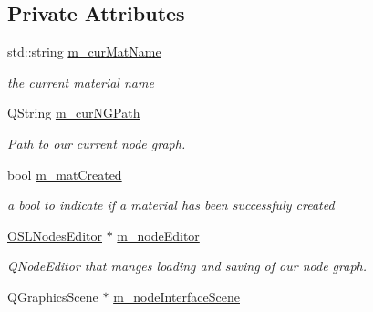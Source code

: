\subsection*{Private Attributes}
\begin{DoxyCompactItemize}
\item 
\hypertarget{class_abstract_material_widget_aa24e234565e46730e0102263774a380c}{std\-::string \hyperlink{class_abstract_material_widget_aa24e234565e46730e0102263774a380c}{m\-\_\-cur\-Mat\-Name}}\label{class_abstract_material_widget_aa24e234565e46730e0102263774a380c}

\begin{DoxyCompactList}\small\item\em the current material name \end{DoxyCompactList}\item 
\hypertarget{class_abstract_material_widget_a5cd78b14d7ada8dcb73cbd9c03f6d2a9}{Q\-String \hyperlink{class_abstract_material_widget_a5cd78b14d7ada8dcb73cbd9c03f6d2a9}{m\-\_\-cur\-N\-G\-Path}}\label{class_abstract_material_widget_a5cd78b14d7ada8dcb73cbd9c03f6d2a9}

\begin{DoxyCompactList}\small\item\em Path to our current node graph. \end{DoxyCompactList}\item 
\hypertarget{class_abstract_material_widget_ae03c748d938aa021c7f18d2a064895f4}{bool \hyperlink{class_abstract_material_widget_ae03c748d938aa021c7f18d2a064895f4}{m\-\_\-mat\-Created}}\label{class_abstract_material_widget_ae03c748d938aa021c7f18d2a064895f4}

\begin{DoxyCompactList}\small\item\em a bool to indicate if a material has been successfuly created \end{DoxyCompactList}\item 
\hypertarget{class_abstract_material_widget_aa0cfa5f820744336c4d75d957576998b}{\hyperlink{class_o_s_l_nodes_editor}{O\-S\-L\-Nodes\-Editor} $\ast$ \hyperlink{class_abstract_material_widget_aa0cfa5f820744336c4d75d957576998b}{m\-\_\-node\-Editor}}\label{class_abstract_material_widget_aa0cfa5f820744336c4d75d957576998b}

\begin{DoxyCompactList}\small\item\em Q\-Node\-Editor that manges loading and saving of our node graph. \end{DoxyCompactList}\item 
\hypertarget{class_abstract_material_widget_a96104151aec95df4b3eecf56486c5cfc}{Q\-Graphics\-Scene $\ast$ \hyperlink{class_abstract_material_widget_a96104151aec95df4b3eecf56486c5cfc}{m\-\_\-node\-Interface\-Scene}}\label{class_abstract_material_widget_a96104151aec95df4b3eecf56486c5cfc}


\end{DoxyCompactItemize}
